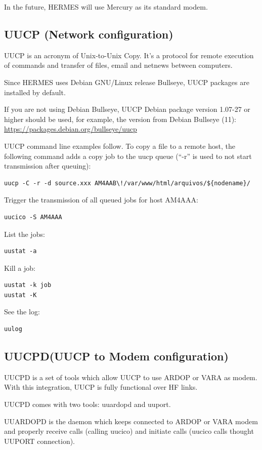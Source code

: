 \documentclass[11pt,a4paper]{article}
\begin{document}
In the future, HERMES will use Mercury as its standard modem.

\subsection{UUCP (Network configuration)}
UUCP is an acronym of Unix-to-Unix Copy.
It's a protocol for remote execution of commands and transfer of files, email and netnews between computers.

Since HERMES uses Debian GNU/Linux release Bullseye, UUCP packages are installed by default.

If you are not using Debian Bullseye, UUCP Debian package version 1.07-27 or higher should be used, for example,
the version from Debian Bullseye (11):
\url{https://packages.debian.org/bullseye/uucp}

UUCP command line examples follow. To copy a file to a remote host,
the following command adds a copy job to the uucp queue (``-r'' is used to
not start transmission after queuing):
\begin{verbatim}
uucp -C -r -d source.xxx AM4AAB\!/var/www/html/arquivos/${nodename}/
\end{verbatim}

Trigger the transmission of all queued jobs for host
AM4AAA:
\begin{verbatim}
uucico -S AM4AAA
\end{verbatim}

List the jobs:
\begin{verbatim}
uustat -a
\end{verbatim}

Kill a job:
\begin{verbatim}
uustat -k job
uustat -K
\end{verbatim}

See the log:
\begin{verbatim}
uulog
\end{verbatim}


\subsection{UUCPD(UUCP to Modem configuration)}

UUCPD is a set of tools which allow UUCP to use ARDOP or VARA as modem. With this integration, UUCP is fully functional over HF links.

UUCPD comes with two tools: uuardopd and uuport.

UUARDOPD is the daemon which keeps connected to ARDOP or VARA modem and properly receive calls (calling uucico) and initiate calls (uucico calls thought UUPORT connection).
\end{document}
